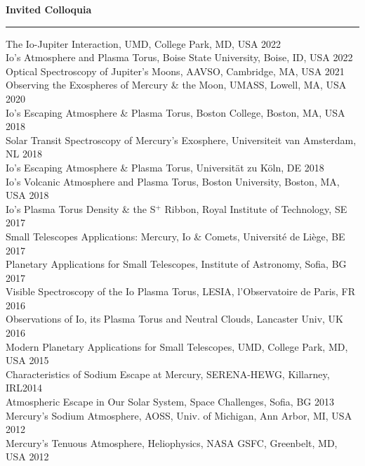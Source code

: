 \documentclass[12pt]{report}
\begin{document}
\noindent\bf{Invited Colloquia}\rm \hspace*{\fill} \\
\rule{\textwidth}{1pt}
\noindent The Io-Jupiter Interaction, UMD, College Park, MD, USA \hfill 2022\\
\noindent Io's Atmosphere and Plasma Torus, Boise State University, Boise, ID, USA \hfill 2022\\
\noindent Optical Spectroscopy of Jupiter's Moons, AAVSO, Cambridge, MA, USA \hfill 2021\\
\noindent Observing the Exospheres of Mercury \& the Moon, UMASS, Lowell, MA, USA \hfill 2020\\
\noindent Io's Escaping Atmosphere \& Plasma Torus, Boston College, Boston, MA, USA \hfill 2018\\
\noindent Solar Transit Spectroscopy of Mercury's Exosphere, Universiteit van Amsterdam, NL \hfill 2018\\
\noindent Io's Escaping Atmosphere \& Plasma Torus, Universit\"at zu K\"oln, DE \hfill 2018\\
\noindent Io's Volcanic Atmosphere and Plasma Torus, Boston University, Boston, MA, USA \hfill 2018\\
\noindent Io's Plasma Torus Density \& the S$^+$ Ribbon, Royal Institute of Technology, SE \hfill 2017\\
\noindent Small Telescopes Applications: Mercury, Io \& Comets, Universit\'e de Li\`ege, BE \hfill 2017\\
\noindent Planetary Applications for Small Telescopes, Institute of Astronomy, Sofia, BG \hfill 2017\\
\noindent Visible Spectroscopy of the Io Plasma Torus, LESIA, l'Observatoire de Paris, FR \hfill 2016\\
\noindent Observations of Io, its Plasma Torus and Neutral Clouds, Lancaster Univ, UK \hfill 2016\\
\noindent Modern Planetary Applications for Small Telescopes, UMD, College Park, MD, USA \hfill 2015\\
\noindent Characteristics of Sodium Escape at Mercury, SERENA-HEWG, Killarney, IRL\hfill 2014\\
\noindent Atmospheric Escape in Our Solar System, Space Challenges, Sofia, BG \hfill 2013\\
\noindent Mercury's Sodium Atmosphere, AOSS, Univ. of Michigan, Ann Arbor, MI, USA \hfill 2012\\
\noindent Mercury's Tenuous Atmosphere, Heliophysics, NASA GSFC, Greenbelt, MD, USA \hfill 2012\\
\end{document}
